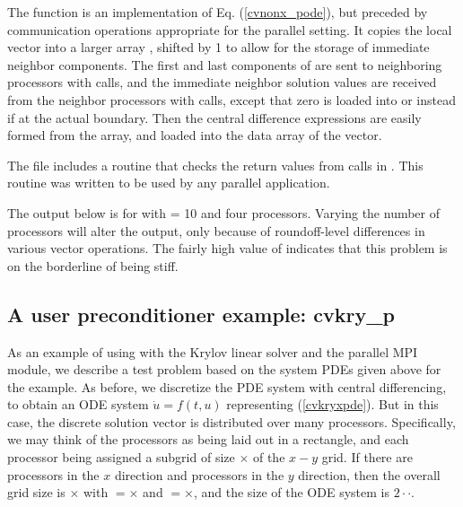 The  function is an implementation of Eq. (\ref{cvnonx_pode}), but preceded
by communication operations appropriate for the parallel setting.
It copies the local vector  into a larger array , shifted by 1
to allow for the storage of immediate neighbor components.  The first and last
components of  are sent to neighboring processors with  calls,
and the immediate neighbor solution values are received from the neighbor
processors with  calls, except that zero is loaded into 
or  instead if at the actual boundary.  Then the central
difference expressions are easily formed from the  array, and loaded into
the data array of the  vector.

The  file includes a routine  that checks the
return values from calls in .  This routine was written to be used
by any parallel {\sundials} application.

The output below is for  with  = 10 and four processors. 
Varying the number of processors will alter the output, only because
of roundoff-level differences in various vector operations.  The fairly
high value of  indicates that this problem is on the borderline
of being stiff.



\subsection{A user preconditioner example: cvkry\_p}\label{ss:cvkry_p}

As an example of using {\cvode} with the Krylov linear solver
{\cvspgmr} and the parallel MPI {\nvecp} module, we describe a test
problem based on the system PDEs given above for the  example.  
As before, we discretize the PDE system with central differencing, to
obtain an ODE system $\dot{u} = f(t,u)$ representing (\ref{cvkryxpde}).  
But in this case, the discrete solution vector is distributed over
many processors.  Specifically, we may think of the processors as
being laid out in a rectangle, and each processor being assigned a
subgrid of size $\times$ of the $x-y$ grid. If
there are  processors in the $x$ direction and 
processors in the $y$ direction, then the overall grid size is
$\times$ with $=$$\times$ and
$=$$\times$, and the size of the ODE system is
$2\cdot$$\cdot$.  

